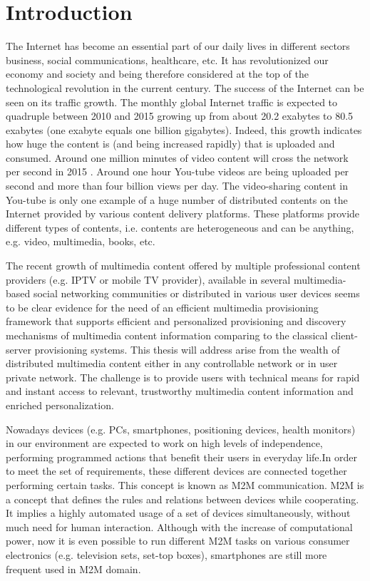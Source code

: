 \chapter{Introduction\label{cha:chapter1}}

The Internet has become an essential part of our daily lives in different sectors business, social communications, healthcare, etc. It has revolutionized our economy and society and being therefore considered at the top of the technological revolution in the current century. The success of the Internet can be seen on its traffic growth. The monthly global Internet traffic is expected to quadruple between 2010 and 2015 growing up from about 20.2 exabytes to 80.5 exabytes (one exabyte equals one billion gigabytes)\cite{cisco1}. Indeed, this growth indicates how huge the content is (and being increased rapidly) that is uploaded and consumed. Around one million minutes of video content will cross the network per second in 2015 \cite{cisco1}. Around one hour You-tube videos are being uploaded per second and more than four billion views per day\cite{youtube1}. The video-sharing content in You-tube is only one example of a huge number of distributed contents on the Internet provided by various content delivery platforms. These platforms provide different types of contents, i.e. contents are heterogeneous and can be anything, e.g. video, multimedia, books, etc. 

The recent growth of multimedia content offered by multiple professional content providers (e.g. \ac{IPTV} or mobile TV provider), available in several multimedia-based social networking communities or distributed in various user devices seems to be clear evidence for the need of an efficient multimedia provisioning framework that supports efficient and personalized provisioning and discovery mechanisms of multimedia content information comparing to the classical client-server provisioning systems. This thesis will address arise from the wealth of distributed multimedia content either in any controllable network or in user private network. The challenge is to provide users with technical means for rapid and instant access to relevant, trustworthy multimedia content information and enriched personalization.

Nowadays devices (e.g. PCs, smartphones, positioning devices, health monitors) in our environment are expected to work on high levels of independence, performing programmed actions that benefit their users in everyday life.In order to meet the set of requirements, these different devices are connected together performing certain tasks. This concept is known as \ac{M2M} communication. \ac{M2M} is a concept that defines the rules and relations between devices while cooperating. It implies a highly automated usage of a set of devices simultaneously, without much need for human interaction. Although with the increase of computational power, now it is even possible to run different \ac{M2M} tasks on various consumer electronics (e.g. television sets, set-top boxes), smartphones are still more frequent used in \ac{M2M} domain.

